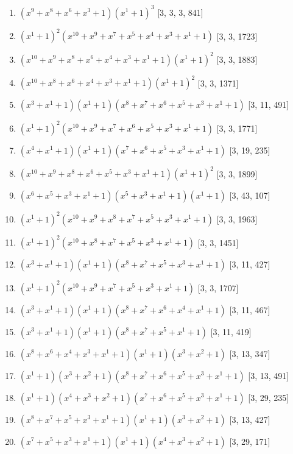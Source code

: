 \documentclass[10pt,twocolumn]{article}
\begin{document}
\begin{enumerate}
\item $(x^{9} + x^{8} + x^{6} + x^{3} + 1)(x^{1} + 1)^{3}$  [3, 3, 3, 841]
\item $(x^{1} + 1)^{2}(x^{10} + x^{9} + x^{7} + x^{5} + x^{4} + x^{3} + x^{1} + 1)$  [3, 3, 1723]
\item $(x^{10} + x^{9} + x^{8} + x^{6} + x^{4} + x^{3} + x^{1} + 1)(x^{1} + 1)^{2}$  [3, 3, 1883]
\item $(x^{10} + x^{8} + x^{6} + x^{4} + x^{3} + x^{1} + 1)(x^{1} + 1)^{2}$  [3, 3, 1371]
\item $(x^{3} + x^{1} + 1)(x^{1} + 1)(x^{8} + x^{7} + x^{6} + x^{5} + x^{3} + x^{1} + 1)$  [3, 11, 491]
\item $(x^{1} + 1)^{2}(x^{10} + x^{9} + x^{7} + x^{6} + x^{5} + x^{3} + x^{1} + 1)$  [3, 3, 1771]
\item $(x^{4} + x^{1} + 1)(x^{1} + 1)(x^{7} + x^{6} + x^{5} + x^{3} + x^{1} + 1)$  [3, 19, 235]
\item $(x^{10} + x^{9} + x^{8} + x^{6} + x^{5} + x^{3} + x^{1} + 1)(x^{1} + 1)^{2}$  [3, 3, 1899]
\item $(x^{6} + x^{5} + x^{3} + x^{1} + 1)(x^{5} + x^{3} + x^{1} + 1)(x^{1} + 1)$  [3, 43, 107]
\item $(x^{1} + 1)^{2}(x^{10} + x^{9} + x^{8} + x^{7} + x^{5} + x^{3} + x^{1} + 1)$  [3, 3, 1963]
\item $(x^{1} + 1)^{2}(x^{10} + x^{8} + x^{7} + x^{5} + x^{3} + x^{1} + 1)$  [3, 3, 1451]
\item $(x^{3} + x^{1} + 1)(x^{1} + 1)(x^{8} + x^{7} + x^{5} + x^{3} + x^{1} + 1)$  [3, 11, 427]
\item $(x^{1} + 1)^{2}(x^{10} + x^{9} + x^{7} + x^{5} + x^{3} + x^{1} + 1)$  [3, 3, 1707]
\item $(x^{3} + x^{1} + 1)(x^{1} + 1)(x^{8} + x^{7} + x^{6} + x^{4} + x^{1} + 1)$  [3, 11, 467]
\item $(x^{3} + x^{1} + 1)(x^{1} + 1)(x^{8} + x^{7} + x^{5} + x^{1} + 1)$  [3, 11, 419]
\item $(x^{8} + x^{6} + x^{4} + x^{3} + x^{1} + 1)(x^{1} + 1)(x^{3} + x^{2} + 1)$  [3, 13, 347]
\item $(x^{1} + 1)(x^{3} + x^{2} + 1)(x^{8} + x^{7} + x^{6} + x^{5} + x^{3} + x^{1} + 1)$  [3, 13, 491]
\item $(x^{1} + 1)(x^{4} + x^{3} + x^{2} + 1)(x^{7} + x^{6} + x^{5} + x^{3} + x^{1} + 1)$  [3, 29, 235]
\item $(x^{8} + x^{7} + x^{5} + x^{3} + x^{1} + 1)(x^{1} + 1)(x^{3} + x^{2} + 1)$  [3, 13, 427]
\item $(x^{7} + x^{5} + x^{3} + x^{1} + 1)(x^{1} + 1)(x^{4} + x^{3} + x^{2} + 1)$  [3, 29, 171]

\end{enumerate}
\end{document}
